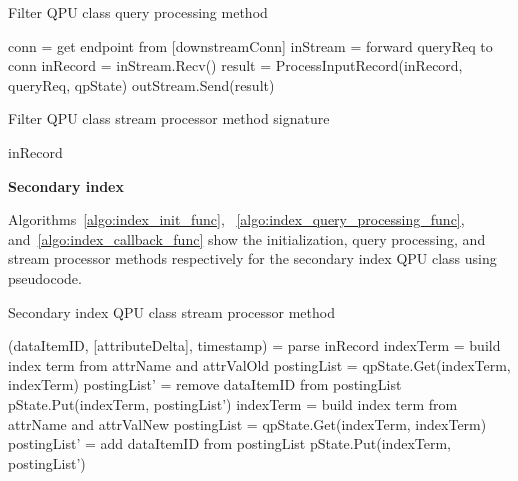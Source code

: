 \begin{algorithm}
\caption{Filter QPU class query processing method}
\label{algo:filter_query_processing_func}
\begin{algorithmic}
\State conn = get endpoint from [downstreamConn] 
\State inStream = forward queryReq to conn
\State inRecord = inStream.Recv()
\State result = ProcessInputRecord(inRecord, queryReq, qpState)
\State outStream.Send(result)
\EndIf
\EndWhile
\EndFunction
\end{algorithmic}
\end{algorithm}

\begin{algorithm}
\caption{Filter QPU class stream processor method signature}
\label{algo:filter_algorithm_func}
\begin{algorithmic}
\State \Return inRecord
\Else
\State \Return []
\EndIf
\EndFunction
\end{algorithmic}
\end{algorithm}


\bigskip
\noindent
\textbf{Secondary index}

Algorithms~\ref{algo:index_init_func}, ~\ref{algo:index_query_processing_func}, and~\ref{algo:index_callback_func}
show the initialization, query processing, and stream processor methods respectively for the secondary index QPU
class using pseudocode.

\begin{algorithm}
\caption{Secondary index QPU class stream processor method}
\label{algo:index_callback_func}
\begin{algorithmic}
\State (dataItemID, [attributeDelta], timestamp) = parse inRecord
\State indexTerm = build index term from attrName and attrValOld
\State postingList = qpState.Get(indexTerm, indexTerm)
\State postingList' = remove dataItemID from postingList
\State pState.Put(indexTerm, postingList')
\EndIf
{}
\State indexTerm = build index term from attrName and attrValNew
\State postingList = qpState.Get(indexTerm, indexTerm)
\State postingList' = add dataItemID from postingList
\State pState.Put(indexTerm, postingList')
\EndIf
\EndFor
\EndFunction
\end{algorithmic}
\end{algorithm}

